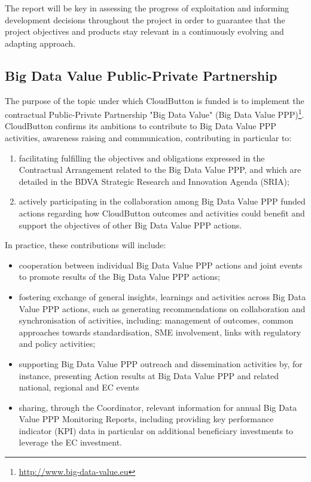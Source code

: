 \documentclass[a4paper,11pt]{article}
\begin{document}
The report will be key in assessing the progress of exploitation and informing development decisions throughout the project in order to guarantee that the project objectives and products stay relevant in a continuously evolving and adapting approach.


\subsection{Big Data Value Public-Private Partnership}

The purpose of the topic under which CloudButton is funded is to implement the contractual Public-Private Partnership "Big Data Value" (Big Data Value PPP)\footnote{\url{http://www.big-data-value.eu}}. 
CloudButton confirms its ambitions to contribute to Big Data Value PPP activities, awareness raising and communication, contributing in particular to:

\begin{enumerate}
\item facilitating fulfilling the objectives and obligations expressed in the Contractual Arrangement
related to the Big Data Value PPP, and which are detailed in the BDVA Strategic Research and Innovation Agenda (SRIA);
\item actively participating in the collaboration among Big Data Value PPP funded actions regarding
how CloudButton outcomes and activities could benefit and support the objectives of
other Big Data Value PPP actions. 
\end{enumerate}

In practice, these contributions will include:

\begin{itemize}
\item cooperation between individual Big Data Value PPP actions and joint events to promote
results of the Big Data Value PPP actions;
\item fostering exchange of general insights, learnings and activities across Big Data Value PPP
actions, such as generating recommendations on collaboration and synchronisation of activities,
including: management of outcomes, common approaches towards
standardisation, SME involvement, links with regulatory and policy activities;
\item supporting Big Data Value PPP outreach and dissemination activities by, for instance, presenting Action results at Big Data Value PPP and related national, regional and EC events
\item sharing, through the Coordinator, relevant information for annual Big Data Value PPP
Monitoring Reports, including providing key performance indicator (KPI) data in particular on
additional beneficiary investments to leverage the EC investment.
\end{itemize}
\end{document}
